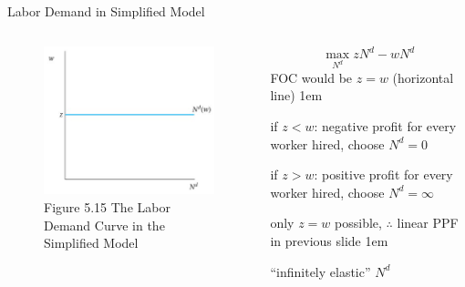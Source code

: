 \documentclass[11pt,aspectratio=43]{beamer}
\let\olditemize=\itemize
\let\endolditemize=\enditemize
\renewenvironment{itemize}{\olditemize \itemsep1em}{\endolditemize}
\theoremstyle{definition}
\begin{document}
\begin{frame}{Labor Demand in Simplified Model}
\label{slide:Labor_Demand_in_Simplified_Model}
    \begin{columns}
        \begin{column}{0.5\textwidth}
            \begin{figure}
                \caption{\scriptsize Figure 5.15  The Labor Demand Curve in the Simplified Model}
                \includegraphics[width=\textwidth]{./figures/Figure_5_15.jpg}
            \end{figure}
        \end{column}
        \begin{column}{0.5\textwidth}
            \begin{equation*}
                 \max_{N^{d}} z N^{d} - wN^{d}
            \end{equation*}
            FOC would be $ z = w $ (horizontal line)
            \begin{itemize}
                \item if $ z < w $: negative profit for every worker hired, choose $ N^{d} = 0 $
                \item if $ z > w $: positive profit for every worker hired, choose $ N^{d} = \infty $
                \item only $ z = w $ possible, $ \therefore $ linear PPF in previous slide
                \begin{itemize}
                    \item ``infinitely elastic'' $ N^{d} $
                \end{itemize}
            \end{itemize}
        \end{column}
    \end{columns}
\end{frame}
\end{document}
